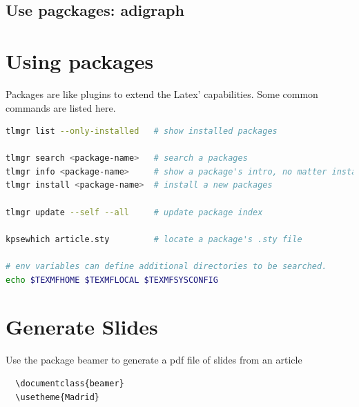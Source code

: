 \documentclass{article}
\begin{document}
 
  \subsection{Use pagckages: adigraph}

\myAdigraph{}

\newpage


\section{Using packages}
Packages are like plugins to extend the Latex' capabilities. Some common commands are listed here.

\begin{lstlisting}[language=bash, caption={tlmgr commands and etc}]
tlmgr list --only-installed   # show installed packages

tlmgr search <package-name>   # search a packages
tlmgr info <package-name>     # show a package's intro, no matter installed or not
tlmgr install <package-name>  # install a new packages

tlmgr update --self --all     # update package index

kpsewhich article.sty         # locate a package's .sty file

# env variables can define additional directories to be searched. 
echo $TEXMFHOME $TEXMFLOCAL $TEXMFSYSCONFIG 
\end{lstlisting}
\newpage


\section{Generate Slides}
Use the package beamer to generate a pdf file of slides from an article


\begin{lstlisting}[caption={Changes in .tex file}]
  % \documentclass{article}
  \documentclass{beamer}
  \usetheme{Madrid}
\end{lstlisting}

\end{document}
